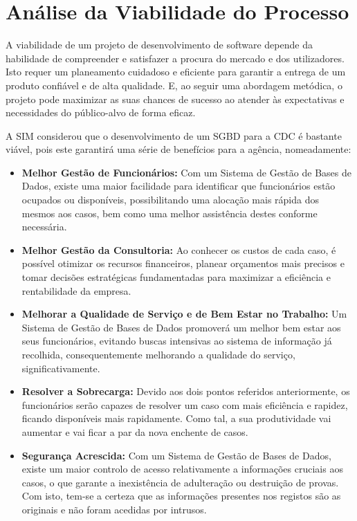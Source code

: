 \documentclass[a4paper,12pt]{scrreprt}
\begin{document}
    \clearpage

    \section{Análise da Viabilidade do Processo}
        A viabilidade de um projeto de desenvolvimento de software depende da habilidade de compreender e satisfazer a procura do mercado e dos utilizadores. Isto requer um planeamento cuidadoso e eficiente para garantir a
        entrega de um produto confiável e de alta qualidade. E, ao seguir uma abordagem metódica, o projeto pode
        maximizar as suas chances de sucesso ao atender às expectativas e necessidades do público-alvo de forma eficaz.
        
        A SIM considerou que o desenvolvimento de um SGBD para a CDC é bastante viável, pois este garantirá uma série de benefícios para a agência, nomeadamente:
        
        \begin{itemize}
            \item \textbf{Melhor Gestão de Funcionários:} Com um Sistema de Gestão de Bases de Dados, existe uma maior facilidade para identificar que funcionários estão ocupados ou disponíveis, possibilitando uma alocação mais rápida dos mesmos aos casos, bem como uma melhor assistência destes conforme necessária.
            
            \item \textbf{Melhor Gestão da Consultoria:} Ao conhecer os custos de cada caso, é possível otimizar os recursos financeiros, planear orçamentos mais precisos e tomar decisões estratégicas fundamentadas para maximizar a eficiência e rentabilidade da empresa.
            
            \item \textbf{Melhorar a Qualidade de Serviço e de Bem Estar no Trabalho:} Um Sistema de Gestão de Bases de Dados
                promoverá um melhor bem estar aos seus funcionários, evitando buscas intensivas ao sistema de
                informação já recolhida, consequentemente melhorando a qualidade do serviço, significativamente.
                
            \item \textbf{Resolver a Sobrecarga:} Devido aos dois pontos referidos anteriormente, os funcionários
                serão capazes de resolver um caso com mais eficiência e rapidez, ficando disponíveis mais rapidamente.
                Como tal, a sua produtividade vai aumentar e vai ficar a par da nova enchente de casos.
                
            \item \textbf{Segurança Acrescida:} Com um Sistema de Gestão de Bases de Dados, existe um maior controlo de acesso relativamente a informações cruciais aos casos, o que garante a inexistência de adulteração ou destruição de provas. Com isto, tem-se a certeza que as informações presentes nos registos são as originais e não foram acedidas por intrusos.
        \end{itemize}
        
\end{document}
